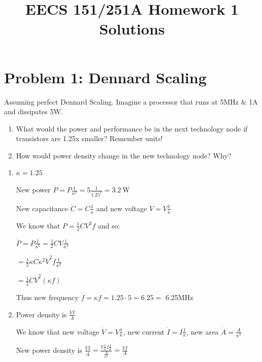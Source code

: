 

\def\PYZsq{\textquotesingle}

\newcommand{\assignmentname}{EECS 151/251A Homework 1 Solutions}
\newcommand{\versionstamp}{Version: 1 - \DTMnow}

\title{\vspace{-0.4in}\Large \bf \assignmentname \vspace{-0.1in}}

\date{}
\maketitle

\thispagestyle{plain}

\section*{Problem 1: Dennard Scaling}
Assuming perfect Dennard Scaling. Imagine a processor that runs at 5MHz \& 1A and dissipates 5W.
\begin{enumerate}[label=(\alph*)]
\item What would the power and performance be in the next technology node if transistors are 1.25x smaller? Remember units!

\item How would power density change in the new technology node? Why?

\end{enumerate}

\begin{solution}
\begin{enumerate}[label=(\alph*)]

\item $\kappa = 1.25$

New power $\dot P = P \frac{1}{\kappa^2} = 5 \frac{1}{1.25^2} =  \SI{3.2}{\watt}$ 

New capacitance $\dot C = C \frac{1}{\kappa}$ and new voltage $\dot V = V \frac{1}{\kappa}$

We know that $P = \frac{1}{2}C V^2f$ and so:

$\dot P = P \frac{1}{\kappa^2} = \frac{1}{2}CV \frac{1}{\kappa^2} $

$=\frac{1}{2} \kappa \dot C \kappa^2 \dot V^2f\frac{1}{\kappa^2}$

$= \frac{1}{2} \dot C \dot V^2 (\kappa f)$

Thus new frequency $\dot f = \kappa f = 1.25 \cdot 5 = 6.25 = $ 6.25MHz

\item Power density is $\frac{V I}{A}$

We know that new voltage $\dot V = V \frac{1}{\kappa}$, new current $\dot I = I \frac{1}{\kappa}$, new area $\dot A = \frac{A}{\kappa^2}$

New power density is $\frac{\dot V \dot I}{\dot A} = \frac{V \frac{1}{\kappa} I \frac{1}{\kappa}}{\frac{A}{\kappa^2}} = \frac{V I}{A}$
\end{enumerate}

\end{solution}

